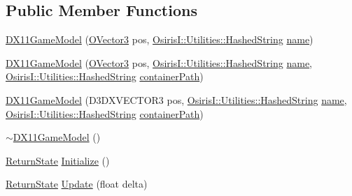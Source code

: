 \subsection*{Public Member Functions}
\begin{DoxyCompactItemize}
\item 
\hyperlink{class_osiris_i_1_1_graphics_1_1_actors_1_1_d_x11_game_model_a5d75125ac8f6e95499e587f31011acdf}{D\-X11\-Game\-Model} (\hyperlink{struct_osiris_i_1_1_o_vector3}{O\-Vector3} pos, \hyperlink{class_osiris_i_1_1_utilities_1_1_hashed_string}{Osiris\-I\-::\-Utilities\-::\-Hashed\-String} \hyperlink{class_osiris_i_1_1_i_osiris_object_a6a3324b9c5ea3afabc9f3ffd9b666db9}{name})
\item 
\hyperlink{class_osiris_i_1_1_graphics_1_1_actors_1_1_d_x11_game_model_a531f42bcdb836ee14de0d597ab9d61d9}{D\-X11\-Game\-Model} (\hyperlink{struct_osiris_i_1_1_o_vector3}{O\-Vector3} pos, \hyperlink{class_osiris_i_1_1_utilities_1_1_hashed_string}{Osiris\-I\-::\-Utilities\-::\-Hashed\-String} \hyperlink{class_osiris_i_1_1_i_osiris_object_a6a3324b9c5ea3afabc9f3ffd9b666db9}{name}, \hyperlink{class_osiris_i_1_1_utilities_1_1_hashed_string}{Osiris\-I\-::\-Utilities\-::\-Hashed\-String} \hyperlink{class_osiris_i_1_1_graphics_1_1_actors_1_1_i_actor_a71a1f44f10a60275425df720cfa84953}{container\-Path})
\item 
\hyperlink{class_osiris_i_1_1_graphics_1_1_actors_1_1_d_x11_game_model_ac824889783ab70f0cf24afa652cb3ba9}{D\-X11\-Game\-Model} (D3\-D\-X\-V\-E\-C\-T\-O\-R3 pos, \hyperlink{class_osiris_i_1_1_utilities_1_1_hashed_string}{Osiris\-I\-::\-Utilities\-::\-Hashed\-String} \hyperlink{class_osiris_i_1_1_i_osiris_object_a6a3324b9c5ea3afabc9f3ffd9b666db9}{name}, \hyperlink{class_osiris_i_1_1_utilities_1_1_hashed_string}{Osiris\-I\-::\-Utilities\-::\-Hashed\-String} \hyperlink{class_osiris_i_1_1_graphics_1_1_actors_1_1_i_actor_a71a1f44f10a60275425df720cfa84953}{container\-Path})
\item 
\hyperlink{class_osiris_i_1_1_graphics_1_1_actors_1_1_d_x11_game_model_aab993a190f012498f724cbb9588573fa}{$\sim$\-D\-X11\-Game\-Model} ()
\item 
\hyperlink{namespace_osiris_i_a8f53bf938dc75c65c6a529694514013e}{Return\-State} \hyperlink{class_osiris_i_1_1_graphics_1_1_actors_1_1_d_x11_game_model_a29d952473bef2b54dbb34eeae48c1227}{Initialize} ()
\item 
\hyperlink{namespace_osiris_i_a8f53bf938dc75c65c6a529694514013e}{Return\-State} \hyperlink{class_osiris_i_1_1_graphics_1_1_actors_1_1_d_x11_game_model_a44bf34642149582f9fee57aca96506de}{Update} (float delta)

\end{DoxyCompactItemize}
